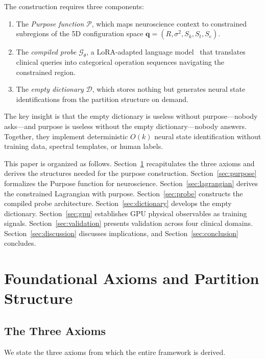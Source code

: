 \documentclass[aps,prd,twocolumn,superscriptaddress,floatfix,nofootinbib]{revtex4-2}
\theoremstyle{remark}
\newcommand{\Sk}{S_k}
\newcommand{\St}{S_t}
\newcommand{\Se}{S_e}
\newcommand{\qvec}{\mathbf{q}}
\newcommand{\Purpose}{\mathcal{P}}
\newcommand{\Probe}{\mathcal{G}}
\newcommand{\Dict}{\mathcal{D}}
\begin{document}
The construction requires three components:
\begin{enumerate}[noitemsep]
    \item The \emph{Purpose function} $\Purpose$, which maps neuroscience context to constrained subregions of the 5D configuration space $\qvec = (R, \sigma^2, \Sk, \St, \Se)$.
    \item The \emph{compiled probe} $\Probe_\theta$, a LoRA-adapted language model~\cite{hu2022lora} that translates clinical queries into categorical operation sequences navigating the constrained region.
    \item The \emph{empty dictionary} $\Dict$, which stores nothing but generates neural state identifications from the partition structure on demand.
\end{enumerate}

The key insight is that the empty dictionary is useless without purpose---nobody asks---and purpose is useless without the empty dictionary---nobody answers.
Together, they implement deterministic $O(k)$ neural state identification without training data, spectral templates, or human labels.

This paper is organized as follows.
Section~\ref{sec:axioms} recapitulates the three axioms and derives the structures needed for the purpose construction.
Section~\ref{sec:purpose} formalizes the Purpose function for neuroscience.
Section~\ref{sec:lagrangian} derives the constrained Lagrangian with purpose.
Section~\ref{sec:probe} constructs the compiled probe architecture.
Section~\ref{sec:dictionary} develops the empty dictionary.
Section~\ref{sec:gpu} establishes GPU physical observables as training signals.
Section~\ref{sec:validation} presents validation across four clinical domains.
Section~\ref{sec:discussion} discusses implications, and Section~\ref{sec:conclusion} concludes.


\section{Foundational Axioms and Partition Structure}
\label{sec:axioms}

\subsection{The Three Axioms}

We state the three axioms from which the entire framework is derived.
\end{document}
